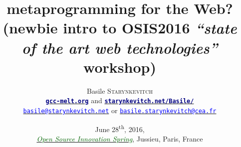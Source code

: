 \documentclass[xcolor=svgnames,final,smaller,a4]{beamer}
\begin{document}
\title[metaprogramming for the Web?]{metaprogramming for the Web? \\
  \vspace{0.2cm}
  \small{(newbie intro to OSIS2016 \emph{``state of the art web technologies''} workshop)}}
\author[Basile Starynkevitch]{Basile \textsc{Starynkevitch} \\
\href{http://gcc-melt.org/}{\textcolor{Navy}{\bf\texttt{\large gcc-melt.org}}} and \href{http://starynkevitch.net/Basile/}{\textcolor{Navy}{\bf\texttt{starynkevitch.net/Basile/}}} \\
\href{mailto:basile@starynkevitch.net}{\textcolor{Blue}{\texttt{basile@starynkevitch.net}}} 
  or
  \href{mailto:basile.starynkevitch@cea.fr}{\textcolor{Blue}{\texttt{basile.starynkevitch@cea.fr}}}}


\date[June 28\textsuperscript{th}, 2016 ~ (OSIS2016)]%
{\small June 28\textsuperscript{th}, 2016, \\
  \href{http://www.open-source-innovation-spring.org}{\textcolor{DarkGreen}{\emph{Open Source Innovation Spring}}}, Jussieu, Paris, France}

\begin{frame}
  \maketitle
  
\end{frame}
\end{document}
